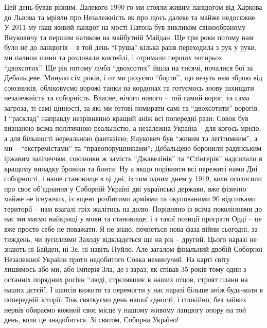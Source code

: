Цей день бував різним. Далекого 1990-го ми стояли живим ланцюгом від Харкова до
Львова та мріяли про Незалежність як про щось далеке та майже недосяжне. У
2011-му наш живий ланцюг на мості Патона був викликом свіжообраному Януковичу
та першим натяком на майбутній Майдан. Ще три роки потому нам було не до
ланцюгів – в той день \enquote{Груша} кілька разів переходила з рук у руки, ми палили
шини та розливали коктейлі, і отримали перших чотирьох \enquote{двохсотих}. Ще рік
потому лічба \enquote{двохсотих} йшла на тисячі, почалися бої за Дебальцеве. Минуло сім
років, і от ми рахуємо \enquote{борти}, що везуть нам зброю від союзників, обліковуємо
ворожі танки на кордонах та готуємось знову захищати незалежність та
соборність. Власне, нічого нового – той самий ворог, та сама загроза, ті самі
цінності, за які ми готові помирати самі та \enquote{двохсотити} ворогів. І \enquote{расклад}
направду незрівнянно кращий аніж всі попередні рази: Совок був визнаною всіма
політичною реальністю, а незалежна Україна – для когось мрією, а для більшості
нереальною фантазією; Янукович був \enquote{живим та легітимним}, а ми –
\enquote{екстремістами} та \enquote{правопорушниками}; Дебальцево боронили радянським іржавим
залізяччям, союзники ж замість \enquote{Джавелінів} та \enquote{Стінгерів} надсилали в кращому
випадку броніки та бинти. Ну а якщо порівняти всі пережиті нами Дні соборності,
і наше становище в ці дні, із тим одним днем у 1919, коли оголосили про своє
об'єднання у Соборній Україні дві українські держави, вже фізично майже не
існуючих, із вщент розбитими арміями та окупованими 90 відсотками території –
нам взагалі гріх жалітись на долю. Порівняно із всіма поколіннями до нас ми
маємо найкращі у мови та становище, і з такої позиції програти Орді – це вже
просто себе не поважати. Я не знаю, почнеться нова фаза війни сьогодні, за
тиждень, чи зусиллями Заходу відкладеться ще на рік – другий. Цього наразі не
знають ні Байден, ні Зе, ні навіть Пуйло. Але загалом фінальний двобій Соборної
Незалежної України проти недобитого Совка неминучий. На карті світу лишимось
або ми, або Імперія Зла, де і зараз, як співав 35 років тому один з останніх
порядних росіян \enquote{люді, стрєлявшиє в наших отцов, строят плани на наших дєтєй}.
І шансів вижити та перемогти у нас наразі більше аніж будь-коли в попередній
історії. Тож святкуємо день нашої єдності, і спокійно, без зайвих нервів
обираємо кожний своє місце у нашому живому ланцюгу опору на той день, коли це
знадобиться. Зі святом, Соборна Україно!
